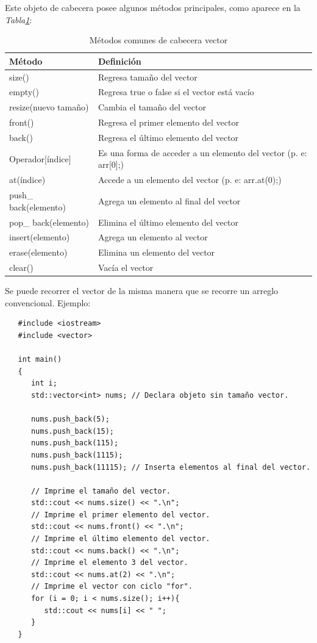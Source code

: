 Este objeto de cabecera posee algunos métodos principales, como aparece en la \textit{Tabla\ref{tab: 10}}:
\begin{table}[H]
    \begin{center}
        \caption{Métodos comunes de cabecera vector}
        \label{tab: 10}
        \begin{tabular}{l | l}
            \hline
            \textbf{Método} & \textbf{Definición} \\
            \hline
            size()					& Regresa tamaño del vector \\
            empty()					& Regresa true o false si el vector está vacío \\
            resize(nuevo tamaño)		& Cambia el tamaño del vector \\
            front()					& Regresa el primer elemento del vector \\
            back()					& Regresa el último elemento del vector \\
            Operador[índice]			& Es una forma de acceder a un elemento del vector (p. e: arr[0];) \\
            at(índice)				& Accede a un elemento del vector (p. e: arr.at(0);) \\
            push\_ back(elemento)	& Agrega un elemento al final del vector \\
            pop\_ back(elemento)		& Elimina el último elemento del vector \\
            insert(elemento)			& Agrega un elemento al vector \\
            erase(elemento)			& Elimina un elemento del vector \\
            clear()					& Vacía el vector \\
            \hline
        \end{tabular}
    \end{center}
\end{table}

Se puede recorrer el vector de la misma manera que se recorre un arreglo convencional. Ejemplo:
\begin{lstlisting}
   #include <iostream>
   #include <vector>

   int main()
   {
      int i;
      std::vector<int> nums; // Declara objeto sin tamaño vector.

      nums.push_back(5);
      nums.push_back(15);
      nums.push_back(115);
      nums.push_back(1115);
      nums.push_back(11115); // Inserta elementos al final del vector.

      // Imprime el tamaño del vector.
      std::cout << nums.size() << ".\n";
      // Imprime el primer elemento del vector.
      std::cout << nums.front() << ".\n";
      // Imprime el último elemento del vector.
      std::cout << nums.back() << ".\n";
      // Imprime el elemento 3 del vector.
      std::cout << nums.at(2) << ".\n";
      // Imprime el vector con ciclo "for".
      for (i = 0; i < nums.size(); i++){
         std::cout << nums[i] << " ";
      }
   }

\end{lstlisting}



